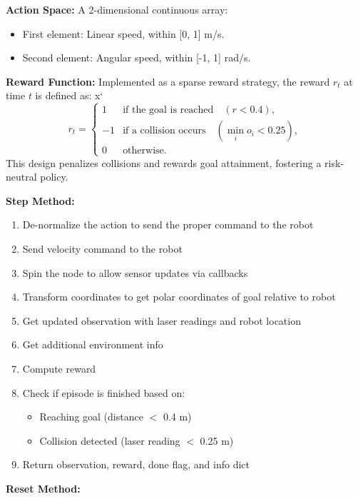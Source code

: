 \documentclass[conference]{IEEEtran}
\begin{document}
\textbf{Action Space:} A 2-dimensional continuous array:
\begin{itemize}
    \item First element: Linear speed, within [0, 1] m/s.
    \item Second element: Angular speed, within [-1, 1] rad/s.
\end{itemize}

\textbf{Reward Function:} Implemented as a sparse reward strategy, the reward \( r_t \) at time \( t \) is defined as:
x`\begin{equation}
    r_t =
    \begin{cases} 
        1 & \text{if the goal is reached} \quad (r < 0.4), \\
        -1 & \text{if a collision occurs} \quad (\min_{i} o_i < 0.25), \\
        0 & \text{otherwise}.
    \end{cases}
\end{equation}
This design penalizes collisions and rewards goal attainment, fostering a risk-neutral policy.


\textbf{Step Method:} %
\begin{enumerate}
\item De-normalize the action to send the proper command to the robot
\item Send velocity command to the robot
\item Spin the node to allow sensor updates via callbacks
\item Transform coordinates to get polar coordinates of goal relative to robot
\item Get updated observation with laser readings and robot location
\item Get additional environment info
\item Compute reward
\item Check if episode is finished based on:
\begin{itemize}
\item Reaching goal (distance $<$ 0.4 m)
\item Collision detected (laser reading $<$ 0.25 m)
\end{itemize}
\item Return observation, reward, done flag, and info dict
\end{enumerate}

\textbf{Reset Method:} 
\end{document}
